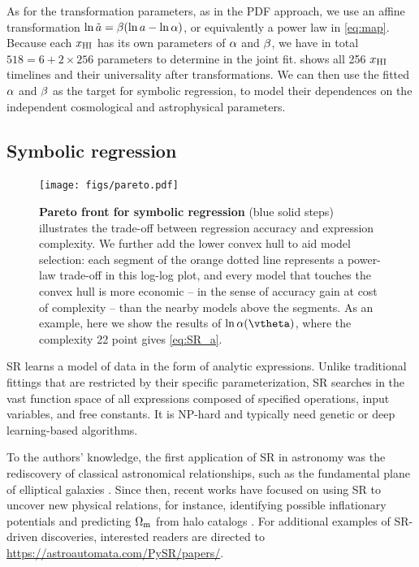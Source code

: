 As for the transformation parameters, as in the PDF approach, we use an
affine transformation $\ln\tilde{a} = \beta (\ln a - \ln\alpha)$, or equivalently
a power law in \cref{eq:map}.
Because each $x_{\mathrm{HI}}$ has its own parameters of $\alpha$ and $\beta$, we
have in total $518 = 6 + 2 \times 256$ parameters to determine in the
joint fit.
 shows all 256 $x_{\mathrm{HI}}$ timelines and their universality
after transformations.
We can then use the fitted $\alpha$ and $\beta$ as the target for symbolic
regression, to model their dependences on the independent cosmological
and astrophysical parameters.


\subsection*{Symbolic regression}
\label{ssec:pysr}

\begin{figure}[tb]
\centering
\texttt{[image: figs/pareto.pdf]}
\caption{\textbf{Pareto front for symbolic regression} (blue solid
steps) illustrates the trade-off between regression accuracy and
expression complexity.
We further add the lower convex hull to aid model selection: each
segment of the orange dotted line represents a power-law trade-off in
this log-log plot, and every model that touches the convex hull is more
economic -- in the sense of accuracy gain at cost of complexity -- than
the nearby models above the segments.
As an example, here we show the results of $\ln\ap(\vtheta)$, where the
complexity 22 point gives \cref{eq:SR_a}.}
\label{fig:pareto}
\end{figure}

SR learns a model of data in the form of analytic expressions.
Unlike traditional fittings that are restricted by their specific
parameterization, SR searches in the vast function space of all
expressions composed of specified operations, input variables, and free
constants.
It is NP-hard \cite{SongEtAl2024, VirgolinPissis2022} and typically need
genetic or deep learning-based algorithms.

To the authors' knowledge, the first application of SR in astronomy was
the rediscovery of classical astronomical relationships, such as the
fundamental plane of elliptical galaxies \cite{Graham2013}.
Since then, recent works have focused on using SR to uncover new
physical relations, for instance, identifying possible inflationary
potentials \cite{Sousa2024} and predicting $\Omega_\mathrm{m}$ from halo catalogs
\cite{Shao2023}.
For additional examples of SR-driven discoveries, interested readers are
directed to \url{https://astroautomata.com/PySR/papers/}.

